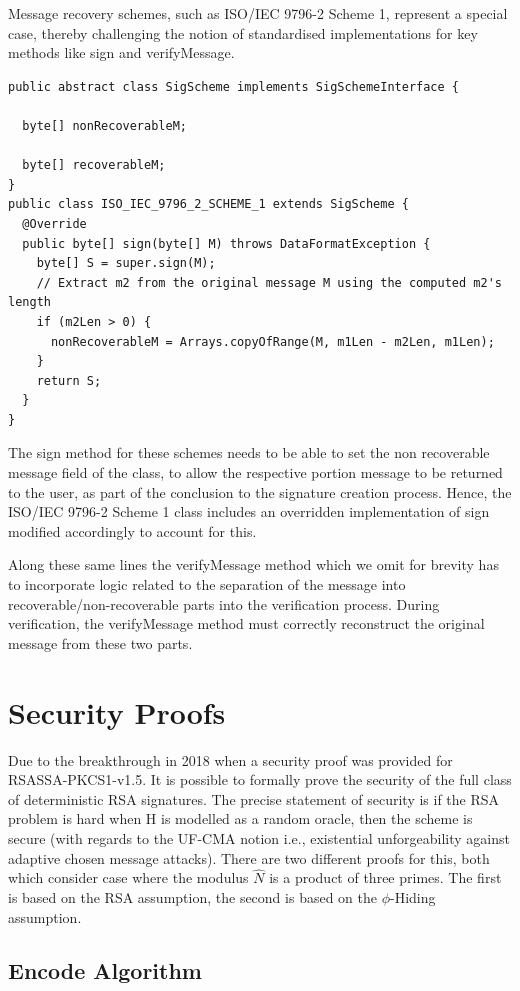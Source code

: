 \documentclass[]{final_report}
\theoremstyle{definition}
\begin{document}
Message recovery schemes, such as ISO/IEC 9796-2 Scheme 1, represent a special case, thereby challenging the notion of standardised implementations for key methods like sign and verifyMessage.
\begin{lstlisting}[caption=Implementation changes for Message Recovery Schemes]
public abstract class SigScheme implements SigSchemeInterface {

  byte[] nonRecoverableM;

  byte[] recoverableM;
}
public class ISO_IEC_9796_2_SCHEME_1 extends SigScheme {
  @Override
  public byte[] sign(byte[] M) throws DataFormatException {
    byte[] S = super.sign(M);
    // Extract m2 from the original message M using the computed m2's length
    if (m2Len > 0) {
      nonRecoverableM = Arrays.copyOfRange(M, m1Len - m2Len, m1Len);
    }
    return S;
  }
}
 \end{lstlisting}
The sign method for these schemes needs to be able to set the non recoverable message field of the class, to allow the respective portion message to be returned to the user, as part of the conclusion to the signature creation process. Hence, the ISO/IEC 9796-2 Scheme 1 class includes an overridden implementation of sign modified accordingly to account for this.

Along these same lines the verifyMessage method which we omit for brevity has to incorporate logic related to the separation of the message into recoverable/non-recoverable parts into the verification process. During verification, the verifyMessage method must correctly reconstruct the original message from these two parts. 

\chapter{Security Proofs}
Due to the breakthrough in 2018 when a security proof \cite{jager2018security}  was provided for RSASSA-PKCS1-v1.5. It is possible to formally prove the security of the full class of deterministic RSA signatures. The precise statement of security is if the RSA problem is hard when H is modelled as a random oracle, then the scheme is secure (with regards to the UF-CMA notion i.e.,  existential unforgeability against adaptive chosen message attacks). There are two different proofs for this, both which consider case where the modulus $\widehat{N}$ is a product of three primes. The first is based on the RSA assumption, the second is based on the $\phi$-Hiding assumption.


\section{Encode Algorithm}
\end{document}
